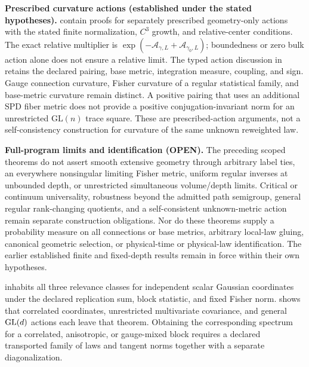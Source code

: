 \begin{description}
\textbf{Prescribed curvature actions (established under the stated hypotheses).}
contain proofs for separately prescribed geometry-only actions with the
stated finite normalization, $C^3$ growth, and relative-center conditions.
The exact relative multiplier is
$\exp(-\mathscr A_{\gamma,L}+\mathscr A_{\gamma_0,L})$;
boundedness or zero bulk action alone does not ensure a relative limit.
The typed action discussion in
 retains the declared
pairing, base metric, integration measure, coupling, and sign.
Gauge connection curvature, Fisher curvature of a regular statistical
family, and base-metric curvature remain distinct. A positive pairing
that uses an additional SPD fiber metric does not provide a positive
conjugation-invariant norm for an unrestricted $\mathrm{GL}(n)$ trace
square. These are prescribed-action arguments, not a self-consistency
construction for curvature of the same unknown reweighted law.

\textbf{Full-program limits and identification (OPEN).}
The preceding scoped theorems do not assert smooth extensive geometry
through arbitrary label ties, an everywhere nonsingular limiting Fisher
metric, uniform regular inverses at unbounded depth, or unrestricted
simultaneous volume/depth limits. Critical or continuum universality,
robustness beyond the admitted path semigroup, general regular
rank-changing quotients, and a self-consistent unknown-metric action
remain separate construction obligations. Nor do these theorems supply
a probability measure on all connections or base metrics, arbitrary
local-law gluing, canonical geometric selection, or physical-time or
physical-law identification. The earlier established finite and
fixed-depth results remain in force within their own hypotheses.

\item[Extensive relevance beyond the scalar Gaussian realization (open).]
 inhabits all three relevance classes for
independent scalar Gaussian coordinates under the declared replication sum,
block statistic, and fixed Fisher norm.   shows that
correlated coordinates, unrestricted multivariate covariance, and general
\(\mathrm{GL}(d)\) actions each leave that theorem.  Obtaining the corresponding
spectrum for a correlated, anisotropic, or gauge-mixed block requires a declared
transported family of laws and tangent norms together with a separate
diagonalization. 


\end{description}
